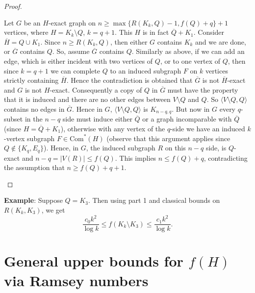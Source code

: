\documentclass[a4paper,12pt]{article}
\begin{document}
\begin{proof}
\begin{enumerate}
{  Let $G$ be an $H$-exact graph on $n \ge \max\{R(K_k, Q)-1, f(Q) + q\}+1$ vertices, where $H = K_k \setminus Q$, $k = q+1$. This $H$ is in fact $\overline{Q} + K_1$.
Consider $\overline{H} = Q \cup K_1$. Since $n \geq R(K_k,Q)$, then either $G$ contains $K_k$ and we are done, or $\overline{G}$ contains $Q$.  
So, assume $\overline{G}$ contains $Q$.
Similarly as above, if we can add an edge, which is either incident with two vertices of $Q$, or to one vertex of $Q$, then since $k = q+1$ we can complete $Q$ to an induced subgraph $F$ on $k$ vertices strictly containing $\overline{H}$.
Hence the contradiction is obtained that $\overline{G}$ is not $\overline{H}$-exact and $G$ is not $H$-exact.  
Consequently a copy of $Q$ in $\overline{G}$ must have the property that it is induced and there are no other edges between $V \setminus Q$ and $Q$.
So $\langle V \setminus Q, Q \rangle$ contains no edges in $\overline{G}$. Hence in $G$, $\langle V \setminus Q, Q \rangle$ is $K_{n-q, q}$.
But now in $G$  every $q$-subset in the $n-q$ side must induce either $\overline{Q}$  or a graph incomparable with $\overline{Q}$ (since $H=\overline{Q}+K_1$), otherwise with any  vertex of the $q$-side we have an induced  $k$-vertex subgraph $F\in \text{Com}^*(H)$ (observe that this argument applies since $Q \notin \{K_q, E_q\}$).  Hence, in  $G$, the induced subgraph $R$  on this $n - q$ side, is $Q$-exact and $n - q = |V(R)|  \leq f(Q)$.  This implies $n \leq f(Q) + q$, contradicting the assumption that $n \geq f(Q) + q+1$. }
\end{enumerate}
\end{proof}
 
 
\noindent \textbf{Example}: Suppose $Q = K_3$. Then using part  1  and classical bounds \cite{campos2025new,kim1995ramsey} on $R(K_k,K_3)$, we get \[\frac{c_0k^2}{\log k} \le  f(K_k \setminus K_3) \le \frac{c_1k^2}{\log k}.\]  
 
 
 



\section{General upper bounds for $f(H)$ via Ramsey numbers}
\end{document}
